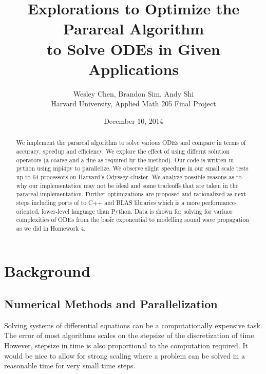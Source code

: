 \documentclass[letterpaper,11pt]{article}
\begin{document}
\title{Explorations to Optimize the Parareal Algorithm \\to Solve ODEs in Given Applications}
\author{Wesley Chen, Brandon Sim, Andy Shi \\
Harvard University, Applied Math 205 Final Project}
\date{December 10, 2014}

\setlength\parindent{0pt}

\setlength\parskip{2ex}

    \maketitle
    \begin{abstract}
    We implement the parareal algorithm to solve various ODEs and compare in
    terms of accuracy, speedup and efficiency. We explore the effect of using
    differnt solution operators (a coarse and a fine as required by the method).
    Our code is written in python using mpi4py to parallelize. We observe
    slight speedups in our small scale tests up to 64 processors on Harvard's
    Odyssey cluster. We analyze possible reasons as to why our implementation
    may not be ideal and some tradeoffs that are taken in the parareal
    implementation. Further optimizations are proposed and rationalized as next
    steps including ports of to C++ and BLAS libraries which is a more
    performance-oriented, lower-level language than Python. Data is shown for
    solving for variuos complexities of ODEs from the basic exponential to
    modelling sound wave propagation as we did in Homework 4.
    \end{abstract}
\section{Background}

\subsection{Numerical Methods and Parallelization}
Solving systems of differential equations can be a computationally expensive
task. The error of most algorithms scales on the stepsize of the discretization
of time. However, stepsize in time is also proportional to the computation
required. It would be nice to allow for strong scaling where a problem can be
solved in a reasonable time for very small time steps.
\end{document}
